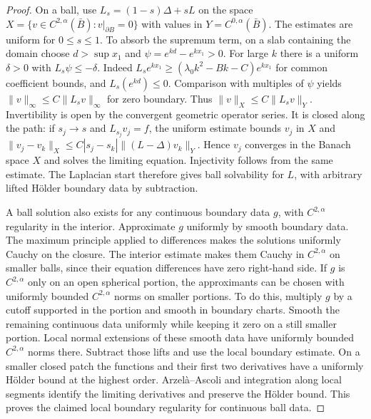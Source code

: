 \documentclass[11pt,oneside,openany]{book}
\theoremstyle{plain}
\theoremstyle{definition}
\theoremstyle{remark}
\begin{document}
\begin{proof}
On a ball, use \(L_s=(1-s)\Delta+sL\) on the space
\(X=\{v\in C^{2,\alpha}(\bar B):v|_{\partial B}=0\}\)
with values in \(Y=C^{0,\alpha}(\bar B)\).
The estimates are uniform for \(0\leq s\leq1\).
To absorb the supremum term, on a slab containing the
domain choose \(d>\sup x_1\) and
\(\psi=e^{kd}-e^{kx_1}>0\). For large \(k\) there is a
uniform \(\delta>0\) with \(L_s\psi\leq-\delta\).
Indeed \(L_s e^{kx_1}\geq
(\lambda_0 k^2-Bk-C)e^{kx_1}\) for common coefficient
bounds, and \(L_s(e^{kd})\leq0\).
Comparison with multiples of \(\psi\) yields
\(\|v\|_\infty\leq C\|L_s v\|_\infty\) for zero boundary.
Thus \(\|v\|_X\leq C\|L_s v\|_Y\).
Invertibility is open by the convergent geometric operator
series. It is closed along the path: if \(s_j\to s\) and
\(L_{s_j}v_j=f\), the uniform estimate bounds \(v_j\) in \(X\)
and
\(\|v_j-v_k\|_X\leq C|s_j-s_k|
\|(L-\Delta)v_k\|_Y\).
Hence \(v_j\) converges in the Banach space \(X\) and solves
the limiting equation. Injectivity follows from the same
estimate. The Laplacian start therefore gives ball
solvability for \(L\), with arbitrary lifted Hölder boundary
data by subtraction.

A ball solution also exists for any continuous boundary
data \(g\), with \(C^{2,\alpha}\) regularity in the interior.
Approximate \(g\) uniformly by smooth boundary data.
The maximum principle applied to differences makes the
solutions uniformly Cauchy on the closure. The interior
estimate makes them Cauchy in \(C^{2,\alpha}\) on smaller
balls, since their equation differences have zero right-hand
side. If \(g\) is \(C^{2,\alpha}\) only on an open spherical
portion, the approximants can be chosen with uniformly
bounded \(C^{2,\alpha}\) norms on smaller portions.
To do this, multiply \(g\) by a cutoff supported in the
portion and smooth in boundary charts. Smooth the remaining
continuous data uniformly while keeping it zero on a still
smaller portion. Local normal extensions of these smooth
data have uniformly bounded \(C^{2,\alpha}\) norms there.
Subtract those lifts and use the local boundary estimate.
On a smaller closed patch the functions and their first
two derivatives have a uniformly Hölder bound at the
highest order. Arzelà--Ascoli and integration along local
segments identify the limiting derivatives and preserve
the Hölder bound. This proves the claimed local boundary
regularity for continuous ball data.


\end{proof}
\end{document}
